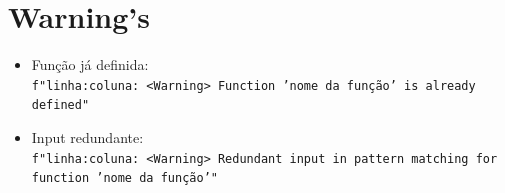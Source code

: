 \documentclass[11pt,a4paper]{report}
\begin{document}
\chapter{Warning's}
\label{appendix:warnings}
\begin{itemize}
    \item Função já definida:\\ \texttt{f"{linha}:{coluna}: <Warning> Function '{nome da função}' is already defined"}
    \item Input redundante:\\ \texttt{f"{linha}:{coluna}: <Warning> Redundant input in pattern matching for function '{nome da função}'"}
\end{itemize}

\nocite{*}


\end{document}
